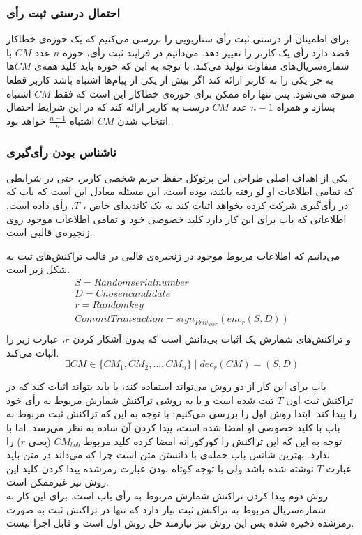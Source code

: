 \subsubsection{احتمال درستی ثبت رأی}
برای اطمینان از درستی ثبت رأی سناریویی را بررسی می‌کنیم که یک حوزه‌ی خطاکار قصد دارد رأی یک کاربر را تغییر دهد. می‌دانیم در فرایند ثبت رأی، حوزه $n$ عدد $CM$ با شماره‌سریال‌های متفاوت تولید می‌کند. با توجه‌ به این که حوزه باید کلید همه‌ی $CM$ها به جز یکی را به کاربر ارائه کند اگر بیش از یکی از پیام‌ها اشتباه باشد کاربر قطعا متوجه می‌شود. پس تنها راه ممکن برای حوزه‌ی خطاکار این است که فقط $CM$ اشتباه بسازد و همراه $n-1$ عدد $CM$ درست به کاربر ارائه کند که در این شرایط احتمال انتخاب شدن $CM$ اشتباه $\frac{n-1}{n}$ خواهد بود. 
\subsubsection{ناشناس بودن رأی‌گیری}
یکی از اهداف اصلی طراحی این پرتوکل حفظ حریم شخصی کاربر، حتی در شرایطی که تمامی اطلاعات او لو رفته باشد، بوده است. این مسئله معادل این است که باب که در رأی‌گیری شرکت کرده بخواهد اثبات کند به یک کاندیدای خاص ، $T$، رأی داده است. اطلاعاتی که باب برای این کار دارد کلید خصوصی خود و تمامی اطلاعات موجود روی زنجیره‌ی قالبی است. 
\par 
می‌دانیم که اطلاعات مربوط موجود در زنجیره‌ی قالبی در قالب تراکنش‌های ثبت به شکل زیر است.
	\begin{equation}
	\begin{matrix}


S = Random serial number\\
D = Chosen candidate\\
r = Random key\\
CommitTransaction = sign_{Priv_{user}} (enc_r(S,D)) \\

	\end{matrix}
\label{eq:commit}
\end{equation}
 و تراکنش‌های شمارش یک اثبات بی‌دانش است که بدون آشکار کردن $r$، عبارت زیر را اثبات می‌کند.
	\begin{equation}
\exists CM \in \{CM_1, CM_2, ..., CM_n\}  \mid dec_r(CM) = (S,D)
\label{eq:a}
\end{equation}


\par 
باب برای این کار از دو روش می‌تواند استفاده کند، یا باید بتواند اثبات کند که در تراکنش ثبت اون $T$ ثبت شده است و یا به روشی تراکنش شمارش مربوط به رأی خود را پیدا کند. ابتدا روش اول را بررسی می‌کنیم: با توجه به این که تراکنش ثبت مربوط به باب با کلید خصوصی او امضا شده است، پیدا کردن آن ساده به نظر می‌رسد. اما با توجه به این که این تراکنش را کورکورانه امضا کرده کلید مربوط $CM_{bob}$ (یعنی $r$) را ندارد. بهترین شانس باب حمله‌ی با دانستن متن
 است چرا که می‌داند در متن باید عبارت $T$ نوشته شده باشد ولی با توجه کوتاه بودن عبارت رمزشده پیدا کردن کلید این روش نیز غیرممکن است. 
 \\
 روش دوم پیدا کردن تراکنش شمارش مربوط به رأی باب است. برای این کار به شماره‌سریال مربوط به تراکنش ثبت نیاز دارد که تنها در تراکنش ثبت به صورت رمزشده ذخیره شده پس این روش نیز نیازمند حل روش اول است و قابل اجرا نیست. 
